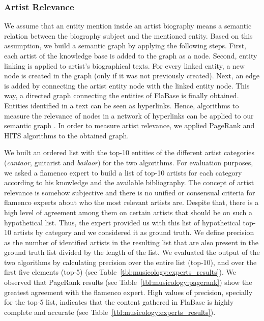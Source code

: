 \subsubsection{Artist Relevance}

We assume that an entity mention inside an artist biography means a semantic relation between the biography subject and the mentioned entity. Based on this assumption, we build a semantic graph by applying the following steps. First, each artist of the knowledge base is added to the graph as a node. Second, entity linking is applied to artist's biographical texts. For every linked entity, a new node is created in the graph (only if it was not previously created). Next, an edge is added by connecting the artist entity node with the linked entity node. This way, a directed graph connecting the entities of FlaBase is finally obtained. Entities identified in a text can be seen as hyperlinks. Hence, algorithms to measure the relevance of nodes in a network of hyperlinks can be applied to our semantic graph \cite{Bellomi2005}. In order to measure artist relevance, we applied PageRank \cite{Brin1998} and HITS \cite{Kleinberg1999} algorithms to the obtained graph. 

We built an ordered list with the top-10 entities of the different artist categories (\textit{cantaor}, guitarist and \textit{bailaor}) for the two algorithms. For evaluation purposes, we asked a flamenco expert to build a list of top-10 artists for each category according to his knowledge and the available bibliography. The concept of artist relevance is somehow subjective and there is no unified or consensual criteria for flamenco experts about who the most relevant artists are. Despite that, there is a high level of agreement among them on certain artists that should be on such a hypothetical list. Thus, the expert provided us with this list of hypothetical top-10 artists by category and we considered it as ground truth. We define precision as the number of identified artists in the resulting list that are also present in the ground truth list divided by the length of the list. We evaluated the output of the two algorithms by calculating precision over the entire list (top-10), and over the first five elements (top-5) (see Table~\ref{tbl:musicology:experts_results}). We observed that Page\-Rank results (see Table~\ref{tbl:musicology:pagerank}) show the greatest agreement with the flamenco expert. 
High values of precision, specially for the top-5 list, indicates that the content gathered in FlaBase is highly complete and accurate (see Table~\ref{tbl:musicology:experts_results}). 

